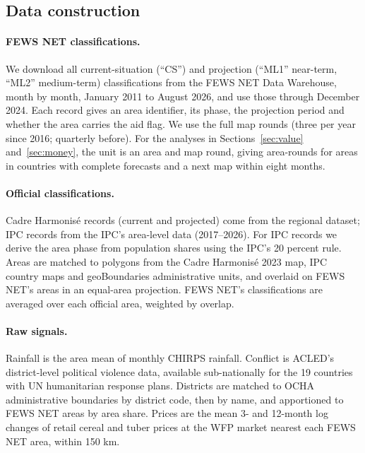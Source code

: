 \documentclass[11pt]{article}
\begin{document}
\newpage
\begin{appendices}
\renewcommand{\thefigure}{A\arabic{figure}}
\renewcommand{\thetable}{A\arabic{table}}
\setcounter{figure}{0}
\setcounter{table}{0}

\section{Data construction}\label{app:data}

\paragraph{FEWS NET classifications.} We download all current-situation (``CS'') and projection (``ML1'' near-term, ``ML2'' medium-term) classifications from the FEWS NET Data Warehouse, month by month, January 2011 to August 2026, and use those through December 2024. Each record gives an area identifier, its phase, the projection period and whether the area carries the aid flag. We use the full map rounds (three per year since 2016; quarterly before). For the analyses in Sections~\ref{sec:value} and~\ref{sec:money}, the unit is an area and map round, giving \panelAreaRounds{} area-rounds for \panelAreas{} areas in \panelCountries{} countries with complete forecasts and a next map within eight months.

\paragraph{Official classifications.} Cadre Harmonis\'e records (current and projected) come from the regional dataset; IPC records from the IPC's area-level data (2017--2026). For IPC records we derive the area phase from population shares using the IPC's 20 percent rule. Areas are matched to polygons from the Cadre Harmonis\'e 2023 map, IPC country maps and geoBoundaries administrative units, and overlaid on FEWS NET's areas in an equal-area projection. FEWS NET's classifications are averaged over each official area, weighted by overlap.

\paragraph{Raw signals.} Rainfall is the area mean of monthly CHIRPS rainfall. Conflict is ACLED's district-level political violence data, available sub-nationally for the 19 countries with UN humanitarian response plans. Districts are matched to OCHA administrative boundaries by district code, then by name, and apportioned to FEWS NET areas by area share. Prices are the mean 3- and 12-month log changes of retail cereal and tuber prices at the WFP market nearest each FEWS NET area, within 150 km.


\end{appendices}
\end{document}

